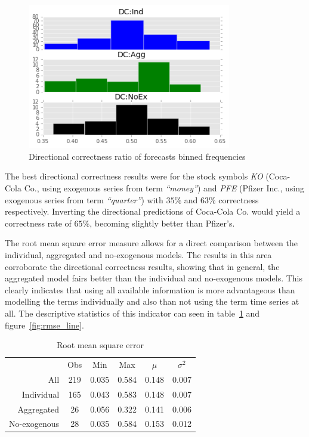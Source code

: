\documentclass[conference,11pt]{IEEEtran}
\begin{document}
\begin{figure}[!htbp]
\centering
\includegraphics[width=3.5in]{dir_corr_hist}
\caption{Directional correctness ratio of forecasts binned frequencies}
\label{fig:dir_corr_hist}
\end{figure}

\par
The best directional correctness results were for the stock symbols \textit{KO} (Coca-Cola Co., using exogenous series from term \textit{``money''}) and \textit{PFE} (Pfizer Inc., using exogenous series from term \textit{``quarter''}) with \(35\%\) and \(63\%\) correctness respectively. Inverting the directional predictions of Coca-Cola Co. would yield a correctness rate of \(65\%\), becoming slightly better than Pfizer's.

\par
The root mean square error measure allows for a direct comparison between the individual, aggregated and no-exogenous models. The results in this area corroborate the directional correctness results, showing that in general, the aggregated model fairs better than the individual and no-exogenous models. This clearly indicates that using all available information is more advantageous than modelling the terms individually and also than not using the term time series at all. The descriptive statistics of this indicator can seen in table~\ref{tab:1} and figure~\ref{fig:rmse_line}.

\begin{table}
\caption{Root mean square error}
\label{tab:1}
\begin{tabular}{ r c c c c c }
             & Obs   & Min   & Max   & \(\mu\) & \(\sigma^2\) \\
All          & 219   & 0.035 & 0.584 & 0.148   & 0.007 \\ 
Individual   & 165   & 0.043 & 0.583 & 0.148   & 0.007 \\
Aggregated   & 26    & 0.056 & 0.322 & 0.141   & 0.006 \\
No-exogenous & 28    & 0.035 & 0.584 & 0.153   & 0.012 \\
\end{tabular}
\end{table}
\end{document}
